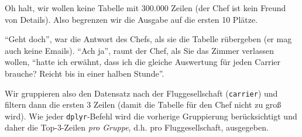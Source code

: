 \documentclass[12pt,ngerman,]{book}
\makeatletter
\newenvironment{Shaded}{\begin{snugshade}}{\end{snugshade}}
\newcommand{\KeywordTok}[1]{\textcolor[rgb]{0.13,0.29,0.53}{\textbf{{#1}}}}
\newcommand{\DecValTok}[1]{\textcolor[rgb]{0.00,0.00,0.81}{{#1}}}
\newcommand{\StringTok}[1]{\textcolor[rgb]{0.31,0.60,0.02}{{#1}}}
\newcommand{\CommentTok}[1]{\textcolor[rgb]{0.56,0.35,0.01}{\textit{{#1}}}}
\newcommand{\NormalTok}[1]{{#1}}
\newenvironment{kframe}{%
\medskip{}
\setlength{\fboxsep}{.8em}
 \def\at@end@of@kframe{}%
 \ifinner\ifhmode%
  \def\at@end@of@kframe{\end{minipage}}%
  \begin{minipage}{\columnwidth}%
 \fi\fi%
 \def\FrameCommand##1{\hskip\@totalleftmargin \hskip-\fboxsep
 \colorbox{shadecolor}{##1}\hskip-\fboxsep
     \hskip-\linewidth \hskip-\@totalleftmargin \hskip\columnwidth}%
 \MakeFramed {\advance\hsize-\width
   \@totalleftmargin\z@ \linewidth\hsize
   \@setminipage}}%
 {\par\unskip\endMakeFramed%
 \at@end@of@kframe}
\renewenvironment{Shaded}{\begin{kframe}}{\end{kframe}}
\makeatother
\begin{document}
Oh halt, wir wollen keine Tabelle mit 300.000 Zeilen (der Chef ist kein
Freund von Details). Also begrenzen wir die Ausgabe auf die ersten 10
Plätze.

\begin{Shaded}
\end{Shaded}

``Geht doch'', war die Antwort des Chefs, als sie die Tabelle rübergeben
(er mag auch keine Emails). ``Ach ja'', raunt der Chef, als Sie das
Zimmer verlassen wollen, ``hatte ich erwähnt, dass ich die gleiche
Auswertung für jeden Carrier brauche? Reicht bis in einer halben
Stunde''.

Wir gruppieren also den Datensatz nach der Fluggesellschaft
(\texttt{carrier}) und filtern dann die ersten 3 Zeilen (damit die
Tabelle für den Chef nicht zu groß wird). Wie jeder
\texttt{dplyr}-Befehl wird die vorherige Gruppierung berücksichtigt und
daher die Top-3-Zeilen \emph{pro Gruppe}, d.h. pro Fluggesellschaft,
ausgegeben.
\end{document}
